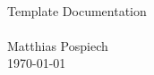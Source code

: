 \begin{titlepage}
   \mbox{}\vspace{5\baselineskip}\\
   \sffamily\huge
   \centering
   Template Documentation
   \rmfamily\Large
   \vspace{1\baselineskip}\\
   
   \vspace{5\baselineskip}\\
   \rmfamily\Large
   Matthias Pospiech
   \vspace{1\baselineskip}\\
   \today
\end{titlepage}
 
